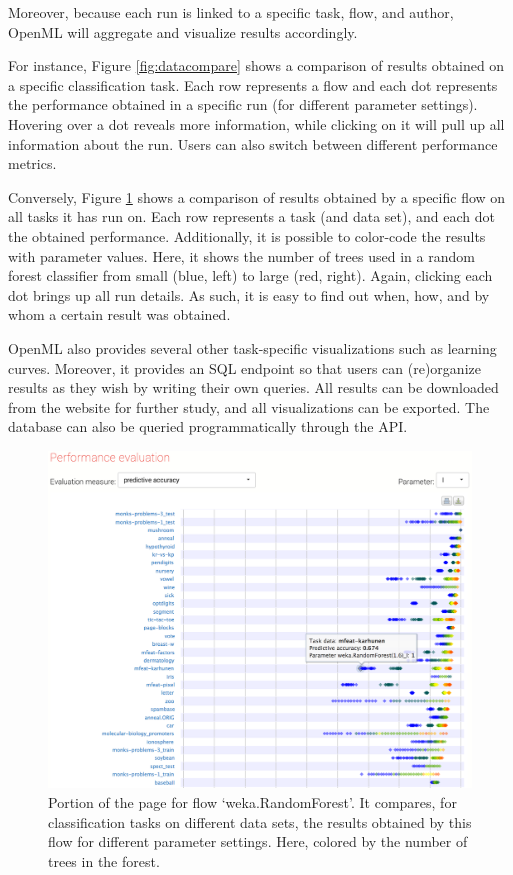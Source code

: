 \documentclass{acmproc-sp}
\begin{document}
Moreover, because each run is linked to a specific task, flow, and author, OpenML will aggregate and visualize results accordingly. 

For instance, Figure \ref{fig:datacompare} shows a comparison of results obtained on a specific classification task. Each row represents a flow and each dot represents the performance obtained in a specific run (for different parameter settings). Hovering over a dot reveals more information, while clicking on it will pull up all information about the run. Users can also switch between different performance metrics.

Conversely, Figure \ref{fig:compare} shows a comparison of results obtained by a specific flow on all tasks it has run on. Each row represents a task (and data set), and each dot the obtained performance. Additionally, it is possible to color-code the results with parameter values. Here, it shows the number of trees used in a random forest classifier from small (blue, left) to large (red, right). Again, clicking each dot brings up all run details. As such, it is easy to find out when, how, and by whom a certain result was obtained.

OpenML also provides several other task-specific visualizations such as learning curves. Moreover, it provides an SQL endpoint so that users can (re)organize results as they wish by writing their own queries. All results can be downloaded from the website for further study, and all visualizations can be exported. The database can also be queried programmatically through the API.

\begin{figure}
\centering
\includegraphics[width=\columnwidth]{openml-compare.png}
\caption{\label{fig:compare} Portion of the page for flow `weka.RandomForest'. It compares, for classification tasks on different data sets, the results obtained by this flow for different parameter settings. Here, colored by the number of trees in the forest.}
\end{figure}
\end{document}
